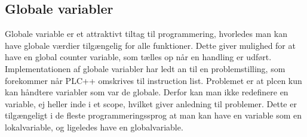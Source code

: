 \subsection*{Globale variabler}
Globale variable er et attraktivt tiltag til programmering, hvorledes man kan have globale værdier tilgængelig for alle funktioner.
Dette giver mulighed for at have en global counter variable, som tælles op når en handling er udført.
Implementationen af globale variabler har ledt an til en problemstilling, som forekommer når PLC++ omskrives til instruction list. Problemet er at \gls{plc}en kun kan håndtere variabler som var de globale.
Derfor kan man ikke redefinere en variable, ej heller inde i et scope, hvilket giver anledning til problemer.
Dette er tilgængeligt i de fleste programmeringssprog at man kan have en variable som en lokalvariable, og ligeledes have en globalvariable.


